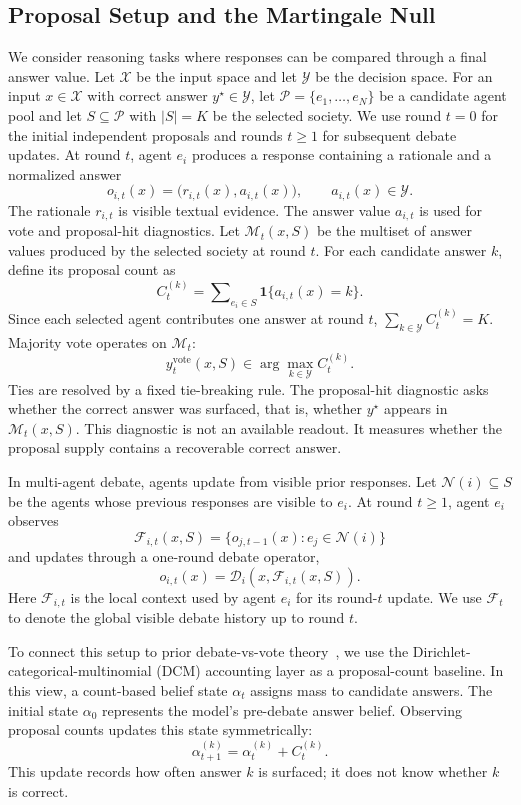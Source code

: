 \subsection{Proposal Setup and the Martingale Null}
\label{subsec:martingale_null}
\label{subsec:dcm_accounting}

We consider reasoning tasks where responses can be compared through a final
answer value. Let $\mathcal X$ be the input space and let $\mathcal Y$ be the
decision space. For an input $x\in\mathcal X$ with correct answer
$y^\star\in\mathcal Y$, let $\mathcal P=\{e_1,\ldots,e_N\}$ be a candidate
agent pool and let $S\subseteq\mathcal P$ with $|S|=K$ be the selected society.
We use round $t=0$ for the initial independent proposals and rounds $t\ge 1$ for
subsequent debate updates. At round $t$, agent $e_i$ produces a response
containing a rationale and a normalized answer
\[
    o_{i,t}(x)=\bigl(r_{i,t}(x),a_{i,t}(x)\bigr),
    \qquad a_{i,t}(x)\in\mathcal Y.
\]
The rationale $r_{i,t}$ is visible textual evidence. The answer value $a_{i,t}$
is used for vote and proposal-hit diagnostics.
Let $\mathcal M_t(x,S)$ be the multiset of answer values produced by the
selected society at round $t$. For each candidate answer $k$, define its
proposal count as
\[
    C_t^{(k)}=\sum\nolimits_{e_i\in S}\mathbf 1\{a_{i,t}(x)=k\}.
\]
Since each selected agent contributes one answer at round $t$,
$\sum_{k\in\mathcal Y}C_t^{(k)}=K$.
Majority vote operates on $\mathcal M_t$:
\[
    y_t^{\mathrm{vote}}(x,S)
    \in
    \arg\max_{k\in\mathcal Y} C_t^{(k)}.
\]
Ties are resolved by a fixed tie-breaking rule. The proposal-hit diagnostic asks
whether the correct answer was surfaced, that is, whether
$y^\star$ appears in $\mathcal M_t(x,S)$. This diagnostic is not an available readout. It
measures whether the proposal supply contains a recoverable correct answer.

In multi-agent debate, agents update from visible prior responses. Let
$\mathcal N(i)\subseteq S$ be the agents whose previous responses are visible to
$e_i$. At round $t\ge 1$,
agent $e_i$ observes
\[
    \mathcal F_{i,t}(x,S)=\{o_{j,t-1}(x):e_j\in\mathcal N(i)\}
\]
and updates through a one-round debate operator,
\[
    o_{i,t}(x)=\mathcal D_i(x,\mathcal F_{i,t}(x,S)).
\]
Here $\mathcal F_{i,t}$ is the local context used by agent $e_i$ for its
round-$t$ update. We use $\mathcal F_t$ to denote the global visible debate history
up to round $t$.

To connect this setup to prior debate-vs-vote theory~\citep{choi2026debate, smit2023are, zhang2025stopovervaluingmultiagentdebate, kaesberg-etal-2025-voting},
we use the Dirichlet-categorical-multinomial (DCM) accounting layer as a
proposal-count baseline. In this view, a count-based
belief state $\alpha_t$ assigns mass to candidate answers. The initial state
$\alpha_0$ represents the model's pre-debate answer belief. Observing proposal
counts updates this state symmetrically:
\begin{equation}
    \alpha_{t+1}^{(k)}=\alpha_t^{(k)}+C_t^{(k)}.
    \label{eq:dcm_count_update}
\end{equation}
This update records how often answer $k$ is surfaced; it does not know whether
$k$ is correct.

